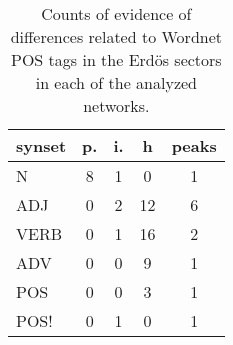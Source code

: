 \begin{table}[h!]
\begin{center}
\begin{tabular}{| l || c | c | c || c |}\hline
{\bf synset} & {\bf p.} & {\bf i.} & {\bf h} & {\bf peaks} \\\hline\hline
N & 8  & 1  & 0  & 1 \\\hline
ADJ & 0  & 2  & 12  & 6 \\\hline
VERB & 0  & 1  & 16  & 2 \\\hline
ADV & 0  & 0  & 9  & 1 \\\hline\hline
POS & 0  & 0  & 3  & 1 \\\hline
POS! & 0  & 1  & 0  & 1 \\\hline
\end{tabular}
\caption{Counts of evidence of differences related to Wordnet POS tags in the Erd\"os sectors in each of the analyzed networks.}
\end{center}
\end{table}